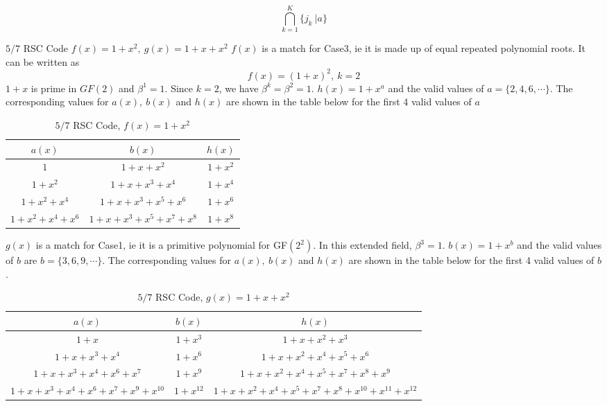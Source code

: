 $$ \bigcap_{k=1}^{K} \{j_k~| a\}$$

\newpage

\begin{example}
$5/7$ RSC Code $f(x)=1+x^2,~g(x) = 1+x+x^2$\newline
$f(x)$ is a match for Case3, ie it is made up of equal repeated polynomial roots. It can be written as $$f(x)=(1+x)^2,~k=2$$ $1+x$ is prime in $GF(2)$ and $\beta^{1}=1$. Since $k=2$, we have $\beta^{k}=\beta^{2}=1$. $h(x)=1+x^a$ and the valid values of $a=\{2,4,6,\cdots \}$.
The corresponding values for $a(x),~b(x)$ and $h(x)$ are shown in the table below for the first 4 valid values of $a$

 \begin{table*}[h]
 \caption{$5/7$ RSC Code, $f(x)=1+x^2$}
\centering
 \begin{tabular}{c c c} 
 \hline
 $a(x)$ & $b(x)$ & $h(x)$ \\ [0.5ex] 
 \hline\hline
$1$ & $1+x+x^2$ & $1+x^2$ \\ 
$1+x^2$ & $1+x+x^3+x^4$ & $1+x^{4}$  \\
$1+x^2+x^4$ & $1+x+x^3+x^5+x^6$ & $1+x^{6}$  \\
$1+x^2+x^4+x^6$ & $1+x+x^3+x^5+x^7+x^8$ & $1+x^{8}$  
 \end{tabular}
 \label{novelTab1}
\end{table*}

$g(x)$ is a match for Case1, ie it is a primitive polynomial for GF$(2^2)$. In this extended field, $\beta^{3}=1$. $b(x)=1+x^b$ and the valid values of $b$ are $b=\{3,6,9,\cdots \}$. The corresponding values for $a(x),~b(x)$ and $h(x)$ are shown in the table below for the first 4 valid values of $b$.

 \begin{table*}[h]
 \caption{$5/7$ RSC Code, $g(x)=1+x+x^2$}
\centering
 \begin{tabular}{c c c} 
 \hline
 $a(x)$ & $b(x)$ & $h(x)$ \\ [0.5ex] 
 \hline\hline
$1+x$ & $1+x^{3}$ &$1+x+x^2+x^3$\\
\hline
$1+x+x^3+x^4$ & $1+x^{6}$ &$1+x+x^2+x^4+x^5+x^6$ \\
\hline
$1+x+x^3+x^4+x^6+x^{7}$ &  $1+x^{9}$ &$1+x+x^2+x^4+x^5+x^7+x^8+x^9$\\
\hline
$1+x+x^3+x^4+x^6+x^{7}+x^9+x^{10}$ &  $1+x^{12}$ &$1+x+x^2+x^4+x^5+x^7+x^8+x^{10}+x^{11}+x^{12}$\\
 \end{tabular}
 \label{novelTab2}
\end{table*}
\end{example}


